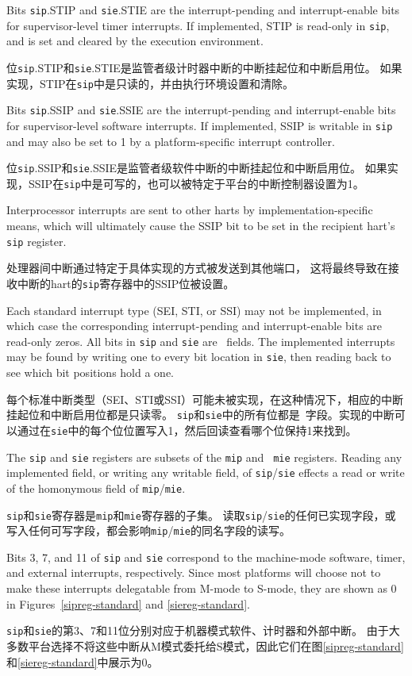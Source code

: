 Bits {\tt sip}.STIP and {\tt sie}.STIE are the interrupt-pending and
interrupt-enable bits for supervisor-level timer interrupts.
If implemented, STIP is read-only in {\tt sip}, and is set and cleared by
the execution environment.

位{\tt sip}.STIP和{\tt sie}.STIE是监管者级计时器中断的中断挂起位和中断启用位。
如果实现，STIP在{\tt sip}中是只读的，并由执行环境设置和清除。

Bits {\tt sip}.SSIP and {\tt sie}.SSIE are the interrupt-pending and
interrupt-enable bits for supervisor-level software interrupts.
If implemented, SSIP is writable in {\tt sip} and may also be set
to 1 by a platform-specific interrupt controller.

位{\tt sip}.SSIP和{\tt sie}.SSIE是监管者级软件中断的中断挂起位和中断启用位。
如果实现，SSIP在{\tt sip}中是可写的，也可以被特定于平台的中断控制器设置为1。

\begin{commentary}
Interprocessor interrupts are sent to other harts by implementation-specific
means, which will ultimately cause the SSIP bit to be set in the recipient
hart's {\tt sip} register.

处理器间中断通过特定于具体实现的方式被发送到其他端口，
这将最终导致在接收中断的hart的{\tt sip}寄存器中的SSIP位被设置。
\end{commentary}
Each standard interrupt type (SEI, STI, or SSI) may not be implemented,
in which case the corresponding interrupt-pending and interrupt-enable
bits are read-only zeros.
All bits in {\tt sip} and {\tt sie} are \warl\ fields.
The implemented interrupts may be found by writing one to every bit
location in {\tt sie}, then reading back to see which bit positions hold
a one.

每个标准中断类型（SEI、STI或SSI）可能未被实现，在这种情况下，相应的中断挂起位和中断启用位都是只读零。
{\tt sip}和{\tt sie}中的所有位都是\warl\ 字段。实现的中断可以通过在{\tt sie}中的每个位位置写入1，然后回读查看哪个位保持1来找到。

\begin{commentary}

The {\tt sip} and {\tt sie} registers are subsets of the {\tt mip} and {\tt
mie} registers.  Reading any implemented field,
or writing any writable field, of {\tt sip}/{\tt sie}
effects a read or write of the homonymous field of {\tt mip}/{\tt mie}.

{\tt sip}和{\tt sie}寄存器是{\tt mip}和{\tt mie}寄存器的子集。
读取{\tt sip}/{\tt sie}的任何已实现字段，或写入任何可写字段，都会影响{\tt mip}/{\tt mie}的同名字段的读写。

Bits 3, 7, and 11 of {\tt sip} and {\tt sie} correspond to the machine-mode
software, timer, and external interrupts, respectively.  Since most platforms
will choose not to make these interrupts delegatable from M-mode to S-mode,
they are shown as 0 in Figures~\ref{sipreg-standard} and
\ref{siereg-standard}.

{\tt sip}和{\tt sie}的第3、7和11位分别对应于机器模式软件、计时器和外部中断。
由于大多数平台选择不将这些中断从M模式委托给S模式，因此它们在图\ref{sipreg-standard}和\ref{siereg-standard}中展示为0。

\end{commentary}

